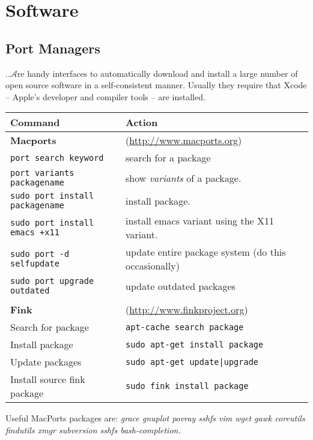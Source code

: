 \documentclass[a4paper,10pt]{article}
\begin{document}

\section{Software}
\subsection{\label{sec:ports}Port Managers}
..$\mathcal{A}$re handy interfaces to automatically download and install a large number of open source software in a self-consistent manner. Usually they require that Xcode -- Apple's developer and compiler tools -- are installed.
\begin{table}[h!]
\center
\begin{small}
\begin{tabular}{ll}\hline\hline
Command              & Action \\\hline
\textbf{Macports}    & (\url{http://www.macports.org})\\
\verb"port search keyword" & search for a package\\
\verb+port variants packagename+ & show \emph{variants} of a package.\\
\verb"sudo port install packagename" & install package.\\
\verb"sudo port install emacs +x11" & install emacs variant using the X11 variant.\\
\verb"sudo port -d selfupdate" & update entire package system (do this occasionally)\\
\verb"sudo port upgrade outdated" & update outdated packages\\
\\
\textbf{Fink}       & (\url{http://www.finkproject.org})\\
Search for package  & \verb"apt-cache search package"\\
Install package     & \verb"sudo apt-get install package"\\
Update packages     &  \verb"sudo apt-get update|upgrade"\\
Install source fink package & \verb"sudo fink install package"\\\hline
\end{tabular}\end{small}\end{table}

Useful MacPorts packages are: \emph{grace gnuplot povray sshfs vim wget gawk coreutils findutils xmgr subversion sshfs bash-completion.}
\end{document}
